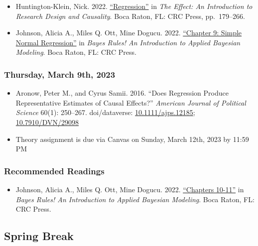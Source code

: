 \documentclass[12pt,]{article}
\providecommand{\tightlist}{%
  \setlength{\itemsep}{0pt}\setlength{\parskip}{0pt}}
\begin{document}
\begin{itemize}
\item
  Huntington-Klein, Nick. 2022.
  \href{https://theeffectbook.net/ch-StatisticalAdjustment.html}{``Regression''}
  in \emph{The Effect: An Introduction to Research Design and
  Causality}. Boca Raton, FL: CRC Press, pp.~179--266.
\item
  Johnson, Alicia A., Miles Q. Ott, Mine Dogucu. 2022.
  \href{https://www.bayesrulesbook.com/chapter-9.html}{``Chapter 9:
  Simple Normal Regression''} in \emph{Bayes Rules! An Introduction to
  Applied Bayesian Modeling}. Boca Raton, FL: CRC Press.
\end{itemize}

\hypertarget{thursday-march-9th-2023}{%
\subsubsection{Thursday, March 9th,
2023}\label{thursday-march-9th-2023}}

\begin{itemize}
\item
  Aronow, Peter M., and Cyrus Samii. 2016. ``Does Regression Produce
  Representative Estimates of Causal Effects?'' \emph{American Journal
  of Political Science} 60(1): 250--267. doi/dataverse:
  \href{https://doi.org/10.1111/ajps.12185}{10.1111/ajps.12185};
  \href{https://dataverse.harvard.edu/dataset.xhtml?persistentId=doi:10.7910/DVN/29098}{10.7910/DVN/29098}
\item
  Theory assignment is due via Canvas on Sunday, March 12th, 2023 by
  11:59 PM
\end{itemize}

\hypertarget{recommended-readings-5}{%
\subsubsection{Recommended Readings}\label{recommended-readings-5}}

\begin{itemize}
\tightlist
\item
  Johnson, Alicia A., Miles Q. Ott, Mine Dogucu. 2022.
  \href{https://www.bayesrulesbook.com/chapter-10.html}{``Chapters
  10-11''} in \emph{Bayes Rules! An Introduction to Applied Bayesian
  Modeling}. Boca Raton, FL: CRC Press.
\end{itemize}

\hypertarget{spring-break}{%
\subsection{Spring Break}\label{spring-break}}
\end{document}
